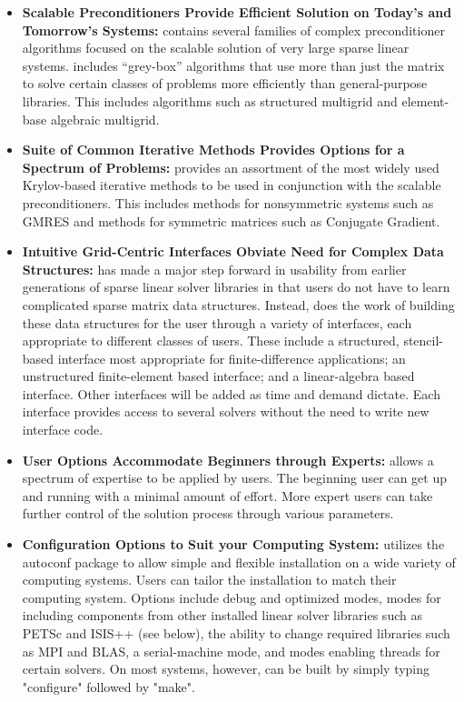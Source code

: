 \begin{itemize}

\item
{\bf Scalable Preconditioners Provide Efficient Solution on Today's and Tomorrow's
Systems:} \hypre{} 
contains several families of complex preconditioner algorithms focused on the
scalable solution of very 
large sparse linear systems. \hypre{} includes ``grey-box'' algorithms that use more
than just the matrix to solve certain classes of problems more efficiently
than
general-purpose libraries. This includes algorithms such as 
structured multigrid and element-base algebraic multigrid.

\item
{\bf Suite of Common Iterative Methods Provides Options for a Spectrum of Problems:}
\hypre{} provides 
an assortment of the most widely used Krylov-based iterative methods to be used
in conjunction with the 
scalable preconditioners. This includes methods for nonsymmetric systems
such as GMRES and
methods for 
symmetric matrices such as Conjugate Gradient.

\item
{\bf Intuitive Grid-Centric Interfaces Obviate Need for Complex Data Structures:}
\hypre{} has made a 
major step forward in usability from earlier generations of sparse linear
solver libraries in that users do not 
have to learn complicated sparse matrix data structures. Instead, \hypre{} does
the work of building these 
data structures for the user through a variety of interfaces, each appropriate
to different classes of users. 
These include a structured, stencil-based interface most appropriate for
finite-difference applications; an 
unstructured finite-element based interface; and a linear-algebra based
interface. Other interfaces will be 
added as time and demand dictate.
Each interface provides access to several solvers without the need to
write new interface code.

\item
{\bf User Options Accommodate Beginners through Experts:} \hypre{} allows a
spectrum of expertise 
to be applied by users. The beginning user can get up and running with a
minimal amount of effort. More expert users can take further
control of the solution process 
through various parameters. 

\item
{\bf Configuration Options to Suit your Computing System:} \hypre{} utilizes the
autoconf package to 
allow simple and flexible installation on a wide variety of computing systems.
Users can tailor the 
installation to match their computing system. Options include debug and
optimized modes, modes for 
including components from other installed linear solver libraries such as PETSc
and ISIS++ (see below), 
the ability to change required libraries such as MPI and BLAS, a
serial-machine mode, and modes 
enabling threads for certain solvers. On most systems, however, \hypre{} can be
built by simply typing 
"configure" followed by "make".


\end{itemize}
